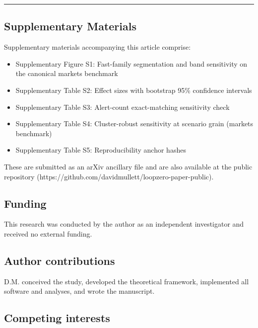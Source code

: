 \documentclass[
  11pt,
]{article}
\providecommand{\tightlist}{%
  \setlength{\itemsep}{0pt}\setlength{\parskip}{0pt}}
\begin{document}
\begin{center}\rule{0.5\linewidth}{0.5pt}\end{center}

\subsection{Supplementary Materials}\label{supplementary-materials}

Supplementary materials accompanying this article comprise:

\begin{itemize}
\tightlist
\item
  Supplementary Figure S1: Fast-family segmentation and band sensitivity
  on the canonical markets benchmark
\item
  Supplementary Table S2: Effect sizes with bootstrap 95\% confidence
  intervals
\item
  Supplementary Table S3: Alert-count exact-matching sensitivity check
\item
  Supplementary Table S4: Cluster-robust sensitivity at scenario grain
  (markets benchmark)
\item
  Supplementary Table S5: Reproducibility anchor hashes
\end{itemize}

These are submitted as an arXiv ancillary file and are also available at
the public repository
(https://github.com/davidmullett/loopzero-paper-public).

\subsection{Funding}\label{funding}

This research was conducted by the author as an independent investigator
and received no external funding.

\subsection{Author contributions}\label{author-contributions}

D.M. conceived the study, developed the theoretical framework,
implemented all software and analyses, and wrote the manuscript.

\subsection{Competing interests}\label{competing-interests}
\end{document}
